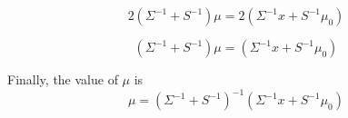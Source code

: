 \documentclass{../amsml}
\begin{document}
\begin{problem}
\begin{itemize}
			 \begin{equation}
				 2(\Sigma^{-1} + S^{-1}) \mu = 2(\Sigma^{-1} x + S^{-1} \mu_0)
			 \end{equation}
			 
			 \begin{equation}
				 (\Sigma^{-1} + S^{-1}) \mu = (\Sigma^{-1} x + S^{-1} \mu_0)
			 \end{equation}
			 
			 Finally, the value of $\mu$ is 
			 \begin{equation}
				 \mu = (\Sigma^{-1} + S^{-1})^{-1} (\Sigma^{-1} x + S^{-1} \mu_0)
			 \end{equation}
\end{itemize}

\end{problem}
\end{document}
